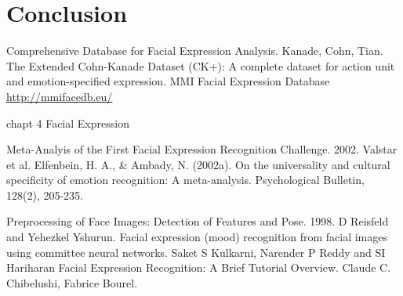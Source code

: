 \documentclass[10pt,twocolumn,letterpaper]{article}
\begin{document}
\section{Conclusion}


\begin{thebibliography}{1}
 Comprehensive Database for Facial Expression Analysis. Kanade, Cohn, Tian.
 The Extended Cohn-Kanade Dataset (CK+): A complete dataset for action unit and emotion-specified expression.
 MMI Facial Expression Database \url{http://mmifacedb.eu/}

 chapt 4 Facial Expression

 Meta-Analyis of the First Facial Expression Recognition Challenge. 2002. Valstar et al.
 Elfenbein, H. A., \& Ambady, N. (2002a). On the universality and cultural specificity of emotion recognition: A meta-analysis. Psychological Bulletin, 128(2), 205-235. 

 Preprocessing of Face Images: Detection of Features and Pose. 1998. D Reisfeld and Yehezkel Yshurun.
 Facial expression (mood) recognition from facial images using committee neural networks. Saket S Kulkarni, Narender P Reddy and SI Hariharan
 Facial Expression Recognition: A Brief Tutorial Overview. Claude C. Chibelushi, Fabrice Bourel.
\end{thebibliography}
\end{document}
